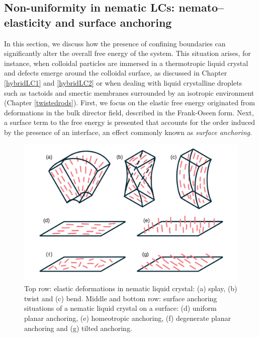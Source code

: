 \subsection{Non-uniformity in nematic LCs: nemato--elasticity and surface anchoring}
\label{nemelasticity}

In this section, we discuss how the presence of confining boundaries can significantly alter the overall free energy of the system. This situation arises, for instance, when colloidal particles are immersed in a thermotropic liquid crystal and defects emerge around the colloidal surface, as discussed in Chapter \ref{hybridLC1} and \ref{hybridLC2} or when dealing with liquid crystalline droplets such as tactoids and smectic membranes surrounded by an isotropic environment  (Chapter \ref{twistedrods}). First, we focus on the elastic free energy originated from deformations in the bulk director field, described in the Frank-Oseen form. Next, a surface term to the free energy is presented that accounts for the order induced by the presence of an interface, an effect commonly known as {\em surface anchoring}.

\begin{figure}
\begin{center}
\includegraphics[width= .9\columnwidth]{figures/chapter-1/elasticmodes}
\caption[Elastic deformations and surface anchoring types]{ \label{elasticmodes} Top row: elastic deformations in nematic liquid crystal: (a) splay, (b) twist and (c) bend. Middle and bottom row: surface anchoring situations of a nematic liquid crystal on a surface: (d) uniform planar anchoring, (e) homeotropic anchoring, (f) degenerate planar anchoring and (g) tilted anchoring.}
\end{center}
\end{figure}

